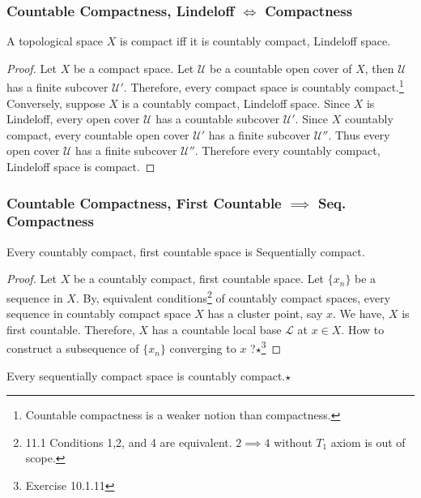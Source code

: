\subsubsection{Countable Compactness, Lindeloff $\iff$ Compactness}
\begin{theorem}
	A topological space $X$ is compact iff it is countably compact, Lindeloff space.
\end{theorem}
\begin{proof}
	Let $X$ be a compact space. Let $\mathcal{U}$ be a  countable open cover of $X$, then $\mathcal{U}$ has a finite subcover $\mathcal{U}'$. Therefore, every compact space is countably compact.\footnote{Countable compactness is a weaker notion than compactness.}\\

	Conversely, suppose $X$ is a countably compact, Lindeloff space.  Since $X$ is Lindeloff, every open cover $\mathcal{U}$ has a countable subcover $\mathcal{U}'$. Since $X$ countably compact, every countable open cover $\mathcal{U}'$ has a finite subcover $\mathcal{U}''$. Thus every open cover $\mathcal{U}$ has a finite subcover $\mathcal{U}''$. Therefore every countably compact, Lindeloff space is compact.
\end{proof}

\subsubsection{Countable Compactness, First Countable $\implies$ Seq. Compactness}
\begin{theorem}
	Every countably compact, first countable space is Sequentially compact.
\end{theorem}
\begin{proof}
	Let $X$ be a countably compact, first countable space. Let $\{x_n\}$ be a sequence in $X$. By, equivalent conditions\footnote{\cite{joshi} 11.1 Conditions 1,2, and 4 are equivalent. $2 \implies 4$ without $T_1$ axiom is out of scope.} of countably compact spaces, every sequence in countably compact space $X$ has a cluster point, say $x$. We have, $X$ is first countable. Therefore, $X$ has a countable local base $\mathcal{L}$ at $x \in X$. How to construct a subsequence of $\{x_n\}$ converging to $x$ ?$\star$\footnote{\cite{joshi} Exercise 10.1.11}
\end{proof}

\begin{remark}
	Every sequentially compact space is countably compact.$\star$
\end{remark}

